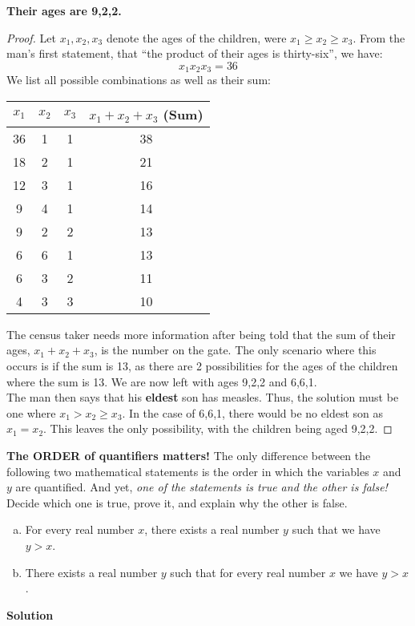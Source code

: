 \documentclass[11pt]{scrartcl}
\theoremstyle{dotlessP}
\theoremstyle{dotlessN}
\begin{document}
\textbf{Their ages are 9,2,2.}
\begin{proof}
Let $x_1,x_2,x_3$ denote the ages of the children, were $x_1 \geq x_2 \geq x_3$. From the man's first statement, that ``the product of their ages is thirty-six'', we have:
	\[
	x_1x_2x_3 = 36
	\] 
	We list all possible combinations as well as their sum:
	\begin{center}
	\begin{tabular}{c|c|c|c}
		$x_1$ & $x_2$ & $x_3$ & $x_1 + x_2 + x_3$ (Sum) \\		
		\hline
		36 & 1 & 1 & 38 \\
		18 & 2 & 1 & 21 \\
		12 & 3 & 1 & 16 \\
		9 & 4 & 1 & 14 \\
		9 & 2 & 2 & 13 \\
		6 & 6 & 1 & 13 \\
		6 & 3 & 2 & 11 \\
		4 & 3 & 3 & 10
	\end{tabular}
	\end{center}
	The census taker needs more information after being told that the sum of their ages, $x_1 + x_2 + x_3$, is the number on the gate. The only scenario where this occurs is if the sum is 13, as there are 2 possibilities for the ages of the children where the sum is 13. We are now left with ages 9,2,2 and 6,6,1. 
	\\

	The man then says that his \textbf{eldest} son has measles. Thus, the solution must be one where $x_1 > x_2 \geq x_3$. In the case of 6,6,1, there would be no eldest son as $x_1 = x_2$. This leaves the only possibility, with the children being aged 9,2,2. 
\end{proof}
\begin{ques}
	\textbf{The ORDER of quantifiers matters!} The only difference between the following two mathematical statements is the order in which the variables $x$ and $y$ are quantified. And yet, \textit{one of the statements is true and the other is false!} Decide which one is true, prove it, and explain why the other is false.
	\begin{enumerate}[(a)]
		\item For every real number $x$, there exists a real number $y$ such that we have $y>x$.
		\item There exists a real number $y$ such that for every real number $x$ we have $y>x$.
	\end{enumerate}
\end{ques}
\textbf{Solution}
\end{document}
